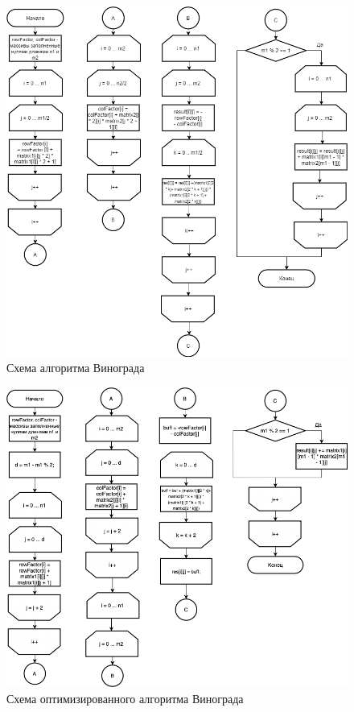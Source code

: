 \documentclass[12pt]{report}
\begin{document}
\begin{figure}[H]
	\centering
	\includegraphics[scale = 0.65]{vin.drawio.png}
	\caption{Схема алгоритма Винограда}
	\label{vin}
\end{figure}

\begin{figure}[H]
	\centering
	\includegraphics[scale=0.65]{vinOpt.drawio.png}
	\caption{Схема оптимизированного алгоритма Винограда}
	\label{optvin}
\end{figure}
\end{document}
